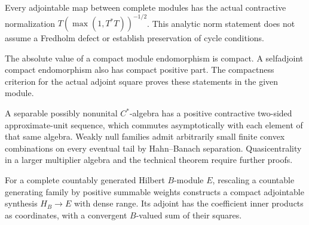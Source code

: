 \begin{proposition}\label{prop:module-contractive-normalization}
\leanok
Every adjointable map between complete modules has the actual contractive
normalization $T(\max(1,T^*T))^{-1/2}$. This analytic norm statement does not
assume a Fredholm defect or establish preservation of cycle conditions.
\end{proposition}

\begin{proposition}\label{prop:module-compact-positive-part}
\leanok
The absolute value of a compact module endomorphism is compact. A selfadjoint
compact endomorphism also has compact positive part. The compactness criterion
for the actual adjoint square proves these statements in the given module.
\end{proposition}

\begin{proposition}\label{prop:cstar-sequential-internal-au}
\leanok
A separable possibly nonunital $C^*$-algebra has a positive contractive
two-sided approximate-unit sequence, which commutes asymptotically with each
element of that same algebra. Weakly null families admit arbitrarily small
finite convex combinations on every eventual tail by Hahn--Banach separation.
Quasicentrality in a larger multiplier algebra and the technical theorem
require further proofs.
\end{proposition}

\begin{proposition}\label{prop:standard-module-synthesis}
\leanok
For a complete countably generated Hilbert $B$-module $E$, rescaling a
countable generating family by positive summable weights constructs a
compact adjointable synthesis $H_B\to E$ with dense range. Its adjoint has
the coefficient inner products as coordinates, with a convergent
$B$-valued sum of their squares.
\end{proposition}

